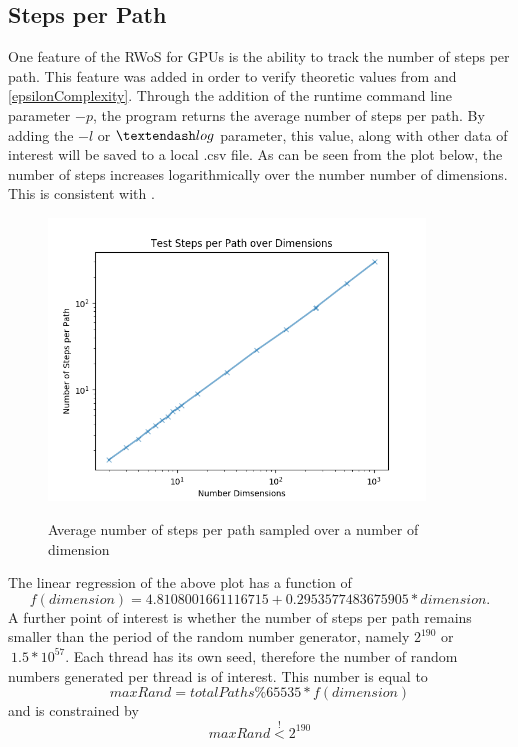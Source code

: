 \subsection{Steps per Path}
One feature of the \Gls{RWoS} for \Glspl{GPU} is the ability to track the number of
steps per path.  This feature was added in order to verify theoretic values from \cite{Bornemann,DeLaurentis} and
\ref{epsilonComplexity}.  Through the addition of the runtime command line parameter
$-p$, the program returns the average number of steps per path.  By adding the $-l$
or $ \textendash log$
parameter, this value, along with other data of interest will be saved to a local
.csv file.  As can be seen from the plot below, the number of steps increases
logarithmically over the number number of dimensions.  This is consistent with \cite{Bornemann, DeLaurentis}.
\begin{figure}
\begin{center}
\includegraphics[width=10.0cm]{styles/pathsPerDim} \label{plot:pathsPerDim}
  \caption{Average number of steps per path sampled over a number of dimension}
\end{center}
\end{figure}
The linear regression of the above plot has a function of $$f(dimension)= 4.8108001661116715 + 0.2953577483675905*dimension.$$
A further point of interest is whether the number of steps per path remains smaller
than the period of the random number generator, namely $2^{190}$ or $~1.5 * 10^{57}$.
Each thread has its own seed, therefore the number of random numbers generated per
thread is of interest.  This number is equal to
$$maxRand = total Paths \% 65535 * f(dimension)$$ and is constrained by
$$ maxRand \overset{!}{<} 2^{190}$$


